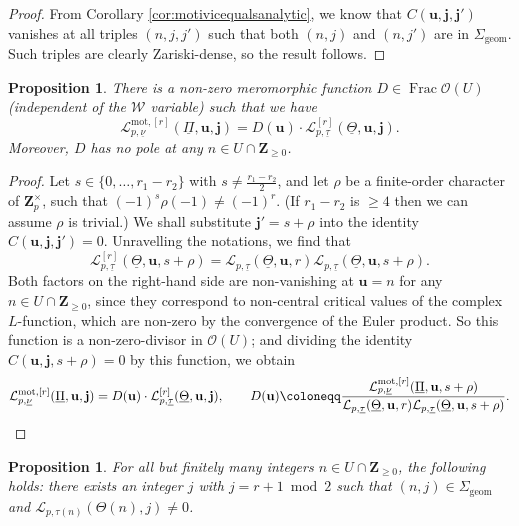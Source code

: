 \documentclass[cjm]{ipart}
\theoremstyle{plain}
\newtheorem{proposition}[theorem]{Proposition}
\theoremstyle{remark}
\newcommand{\ZZ}{\mathbf{Z}}
\newcommand{\Zp}{\mathbf{Z}_p}
\newcommand{\bfj}{\mathbf{j}}
\newcommand{\cL}{\mathcal{L}}
\newcommand{\cO}{\mathcal{O}}
\newcommand{\cW}{\mathcal{W}}
\newcommand{\uPi}{\underline{\Pi}}
\newcommand{\uTh}{\underline{\Theta}}
\newcommand{\unu}{\underline{\nu}}
\newcommand{\utau}{\underline{\tau}}
\numberwithin{equation}{subsection}
\renewcommand{\ge}{\geqslant}
\begin{document}
  \begin{proof}
   From Corollary \ref{cor:motivicequalsanalytic}, we know that $C(\mathbf{u}, \bfj, \bfj')$ vanishes at all triples $(n, j, j')$ such that both $(n, j)$ and $(n, j')$ are in $\Sigma_{\mathrm{geom}}$. Such triples are clearly Zariski-dense, so the result follows.
  \end{proof}

  \begin{proposition}
   \label{prop:existD}
   There is a non-zero meromorphic function $D \in \operatorname{Frac} \cO(U)$ (independent of the $\cW$ variable) such that we have
   \[ \cL^{\mathrm{mot}, [r]}_{p, \unu}(\uPi, \mathbf{u}, \bfj) = D(\mathbf{u}) \cdot \cL^{[r]}_{p, \utau}(\uTh,\mathbf{u}, \bfj). \]
   Moreover, $D$ has no pole at any $n \in U \cap \ZZ_{\ge 0}$.
  \end{proposition}

  \begin{proof}
   Let $s \in \{0, \dots, r_1 - r_2\}$ with $s \ne \tfrac{r_1 - r_2}{2}$, and let $\rho$ be a finite-order character of $\Zp^\times$, such that $(-1)^s \rho(-1) \ne (-1)^r$. (If $r_1 -r_2$ is $\ge 4$ then we can assume $\rho$ is trivial.) We shall substitute $\bfj' =  s + \rho$ into the identity $C(\mathbf{u}, \bfj, \bfj') = 0$. Unravelling the notations, we find that
   \[\cL^{[r]}_{p, \utau}(\uTh,\mathbf{u}, s + \rho) =
   \cL_{p, \utau}(\uTh, \mathbf{u}, r) \cL_{p, \utau}(\uTh, \mathbf{u}, s + \rho).\]
   Both factors on the right-hand side are non-vanishing at $\mathbf{u} = n$ for any $n \in U \cap \ZZ_{\ge 0}$, since they correspond to non-central critical values of the complex $L$-function, which are non-zero by the convergence of the Euler product. So this function is a non-zero-divisor in $\cO(U)$; and dividing the identity $C(\mathbf{u}, \bfj, s+\rho) = 0$ by this function, we obtain
   \[
     \cL^{\mathrm{mot}, [r]}_{p, \unu}(\uPi, \mathbf{u}, \bfj) = D(\mathbf{u})
      \cdot \cL^{[r]}_{p, \utau}(\uTh, \mathbf{u}, \bfj),\qquad D(\mathbf{u})\coloneqq \frac{\cL^{\mathrm{mot}, [r]}_{p, \unu}(\uPi, \mathbf{u}, s + \rho)}{\cL_{p, \utau}(\uTh, \mathbf{u}, r) \cL_{p, \utau}(\uTh, \mathbf{u}, s + \rho)}.\qedhere
   \]
  \end{proof}


  \begin{proposition}
   \label{prop:goodpair}
   For all but finitely many integers $n \in U \cap \ZZ_{\ge 0}$, the following holds: there exists an integer $j$ with $j = r+1 \bmod 2$ such that $(n, j) \in \Sigma_{\mathrm{geom}}$ and $\cL_{p, \tau(n)}(\Theta(n),j) \ne 0$.
  \end{proposition}
\end{document}

